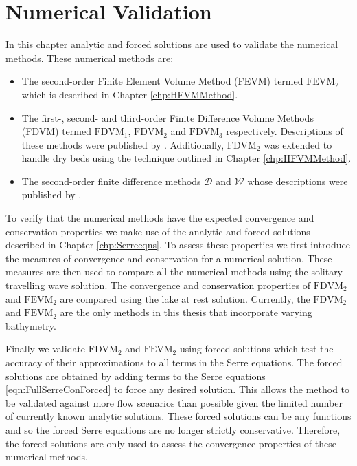 
\chapter{Numerical Validation}
\label{chp:NumMethodComp}
In this chapter analytic and forced solutions are used to validate the numerical methods. These numerical methods are:
\begin{itemize}
	\item The second-order Finite Element Volume Method (FEVM) termed $\text{FEVM}_2$ which is described in Chapter \ref{chp:HFVMMethod}.
	\item The first-, second- and third-order Finite Difference Volume Methods (FDVM) termed $\text{FDVM}_1$, $\text{FDVM}_2$ and $\text{FDVM}_3$ respectively. Descriptions of these methods were published by \citet{Zoppou-etal-2017}. Additionally, $\text{FDVM}_2$ was extended to handle dry beds using the technique outlined in Chapter \ref{chp:HFVMMethod}. 
	\item The second-order finite difference methods $\mathcal{D}$ and $\mathcal{W}$  whose descriptions were published by \citet{Pitt-2018-61}.
\end{itemize} 


To verify that the numerical methods have the expected convergence and conservation properties we make use of the analytic and forced solutions described in Chapter \ref{chp:Serreeqns}. To assess these properties we first introduce the measures of convergence and conservation for a numerical solution. These measures are then used to compare all the numerical methods using the solitary travelling wave solution. The convergence and conservation properties of $\text{FDVM}_2$ and $\text{FEVM}_2$ are compared using the lake at rest solution. Currently, the $\text{FDVM}_2$ and $\text{FEVM}_2$ are the only methods in this thesis that incorporate varying bathymetry.

Finally we validate $\text{FDVM}_2$ and $\text{FEVM}_2$ using forced solutions which test the accuracy of their approximations to all terms in the Serre equations. The forced solutions are obtained by adding terms to the Serre equations \eqref{eqn:FullSerreConForced} to force any desired solution. This allows the method to be validated against more flow scenarios than possible given the limited number of currently known analytic solutions. These forced solutions can be any functions and so the forced Serre equations are no longer strictly conservative. Therefore, the forced solutions are only used to assess the convergence properties of these numerical methods. 

